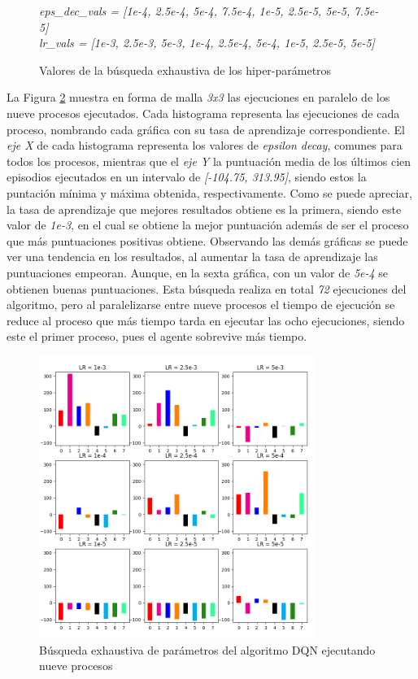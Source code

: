 \begin{figure}[!h]		
	
	
	\begin{tcolorbox}[boxrule=0.5pt, fontupper=\small]				
		
		\begin{center}
			\textit{eps\_dec\_vals = [1e-4, 2.5e-4, 5e-4, 7.5e-4, 1e-5, 2.5e-5, 5e-5, 7.5e-5]	\\			
				lr\_vals = [1e-3, 2.5e-3, 5e-3, 1e-4, 2.5e-4, 5e-4, 1e-5, 2.5e-5, 5e-5]	}
		\end{center}			
		
	\end{tcolorbox}
	\caption{Valores de la búsqueda exhaustiva de los hiper-parámetros}
	\label{dqn_params}
\end{figure}

La Figura \ref{fig:dqn_search} muestra en forma de malla \textit{3x3} las ejecuciones en paralelo de los nueve procesos ejecutados. Cada histograma representa las ejecuciones de cada proceso, nombrando cada gráfica con su tasa de aprendizaje correspondiente. El \textit{eje X} de cada histograma representa los valores de \textit{epsilon decay}, comunes para todos los procesos, mientras que el \textit{eje Y} la puntuación media de los últimos cien episodios ejecutados en un intervalo de \textit{[-104.75, 313.95]}, siendo estos la puntación mínima y máxima obtenida, respectivamente. Como se puede apreciar, la tasa de aprendizaje que mejores resultados obtiene es la primera, siendo este valor de \textit{1e-3}, en el cual se obtiene la mejor puntuación además de ser el proceso que más puntuaciones positivas obtiene. Observando las demás gráficas se puede ver una tendencia en los resultados, al aumentar la tasa de aprendizaje las puntuaciones empeoran. Aunque, en la sexta gráfica, con un valor de \textit{5e-4} se obtienen buenas puntuaciones. Esta búsqueda realiza en total \textit{72} ejecuciones del algoritmo, pero al paralelizarse entre nueve procesos el tiempo de ejecución se reduce al proceso que más tiempo tarda en ejecutar las ocho ejecuciones, siendo este el primer proceso, pues el agente sobrevive más tiempo.




\begin{figure}[!h]
	\centering
	\includegraphics[width=0.8\textwidth]{images/chapter_4/DQN_search}
	\caption{Búsqueda exhaustiva de parámetros del algoritmo DQN ejecutando nueve procesos}
	\label{fig:dqn_search}
\end{figure}
